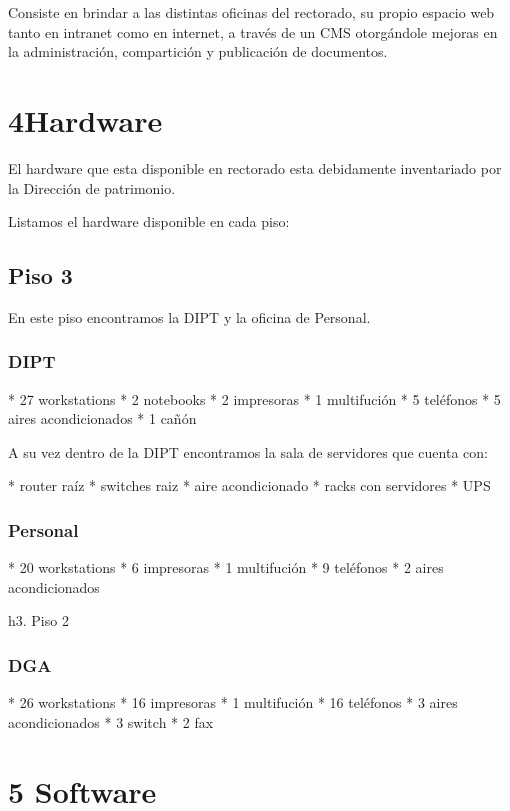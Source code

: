 \documentclass[a4paper,11pt,oneside]{article}
\begin{document}
Consiste en brindar a las distintas oficinas del rectorado, su propio espacio web tanto en intranet como en internet, a través de un CMS otorgándole mejoras en la administración, compartición y publicación de documentos.

\section*{4Hardware}

El hardware que esta disponible en rectorado esta debidamente inventariado por la Dirección de patrimonio.

Listamos el hardware disponible en cada piso:

\subsection*{Piso 3}

En este piso encontramos la DIPT y la oficina de Personal.

\subsubsection*{DIPT}

* 27 workstations
* 2 notebooks
* 2 impresoras
* 1 multifución
* 5 teléfonos
* 5 aires acondicionados
* 1 cañón

A su vez dentro de la DIPT encontramos la sala de servidores que cuenta con:

* router raíz
* switches raiz
* aire acondicionado
* racks con servidores
* UPS

\subsubsection*{Personal}

* 20 workstations
* 6 impresoras
* 1 multifución
* 9 teléfonos
* 2 aires acondicionados

h3. Piso 2

\subsubsection*{DGA}

* 26 workstations
* 16 impresoras
* 1 multifución
* 16 teléfonos
* 3 aires acondicionados
* 3 switch
* 2 fax

\section*{5 Software}
\end{document}
